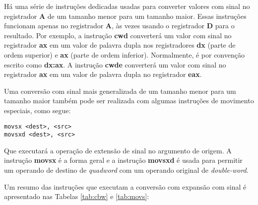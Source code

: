 Há uma série de instruções dedicadas usadas para converter valores com sinal no registrador \textbf{A} de um tamanho menor para um tamanho maior. Essas instruções funcionam apenas no registrador \textbf{A}, às vezes usando o registrador \textbf{D} para o resultado. Por exemplo, a instrução \textbf{cwd} converterá um valor com sinal no registrador \textbf{ax} em um valor de palavra dupla nos registradores \textbf{dx} (parte de ordem superior) e \textbf{ax} (parte de ordem inferior). Normalmente, é por convenção escrito como \textbf{dx:ax}. A instrução \textbf{cwde} converterá um valor com sinal no registrador \textbf{ax} em um valor de palavra dupla no registrador \textbf{eax}.

Uma conversão com sinal mais generalizada de um tamanho menor para um tamanho maior também pode ser realizada com algumas instruções de movimento especiais, como segue:

\begin{lstlisting}
movsx <dest>, <src>
movsxd <dest>, <src>
\end{lstlisting}

Que executará a operação de extensão de sinal no argumento de origem. A instrução \textbf{movsx} é a forma geral e a instrução \textbf{movsxd} é usada para permitir um operando de destino de \textit{quadword} com um operando original de \textit{double-word}.

Um resumo das instruções que executam a conversão com expansão com sinal é apresentado nas Tabelas \ref{tab:cbw} e \ref{tab:movs}:

